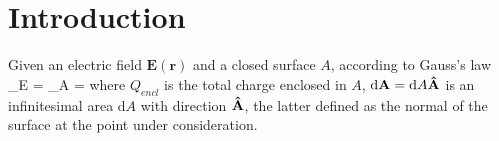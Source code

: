 \section{Introduction}
Given an electric field $\mathbf{E}(\mathbf{r})$ and a closed surface $A$, according to Gauss's law
\be\label{gauss-law}
\Phi_E = \oiint_A  \cdot {} =
\ee
where $Q_{encl}$ is the total charge enclosed in $A$, $\mathrm{d}\mathbf{A}=\mathrm{d}A\boldsymbol{\hat{\textbf{$\mathrm A$}}}$ is an infinitesimal area $\mathrm{d}A$ with
direction $\boldsymbol{\hat{\textbf{$\mathrm A$}}}$, the latter defined as the normal of the surface at the point under consideration.
